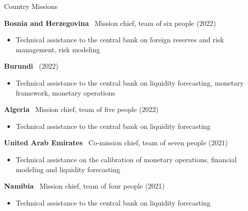 \documentclass[usegeometry, 10pt, a4paper]{cv} %
\newcommand{\activite}[1]{\textbf{#1}\ }
\newcommand{\midreduce}{-0.5cm}
\begin{document}
  \begin{rubriquetableau}[0.95\textwidth]{Country Missions}
    \vspace{-0.5cm}
    
  \activite{Bosnia and Herzegovina} Mission chief, team of six people (2022)\\
  \vspace{\midreduce}
  \begin{itemize}[label={}]
  \item \small{Technical assistance to the central bank on foreign reserves and risk management, risk modeling}    
  \end{itemize}

  \activite{Burundi} (2022)\\
  \vspace{\midreduce}
  \begin{itemize}[label={}]
  \item \small{Technical assistance to the central bank on liquidity forecasting, monetary framework, monetary operations}    
  \end{itemize}
  
  \activite{Algeria} Mission chief, team of five people (2022)\\
  \vspace{\midreduce}
  \begin{itemize}[label={}]
  \item \small{Technical assistance to the central bank on liquidity forecasting}    
  \end{itemize}
  
  \activite{United Arab Emirates} Co-mission chief, team of seven people (2021)\\
  \vspace{\midreduce}
  \begin{itemize}[label={}]
    \item \small{Technical assistance on the calibration of monetary
        operations, financial modeling and liquidity forecasting}
  \end{itemize}

  \activite{Namibia} Mission chief, team of four people (2021) \\
  \vspace{\midreduce}
  \begin{itemize}[label={}]
    \item \small{Technical assistance to the central bank on liquidity forecasting}
  \end{itemize}


\end{rubriquetableau}
\end{document}
